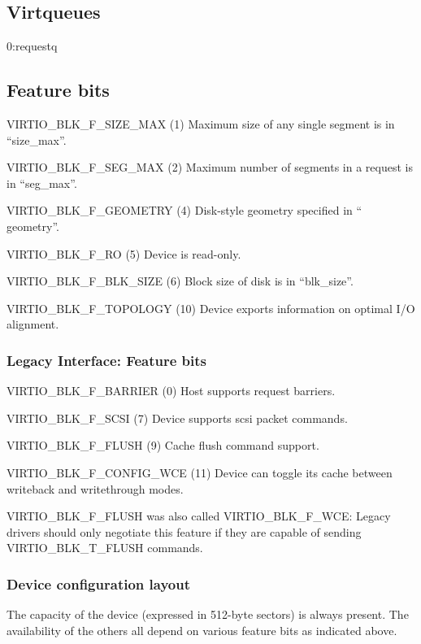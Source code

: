 \subsection{Virtqueues}\label{sec:Device Types / Block Device / Virtqueues}
  0:requestq

\subsection{Feature bits}\label{sec:Device Types / Block Device / Feature bits}

  VIRTIO_BLK_F_SIZE_MAX (1) Maximum size of any single segment is
    in “size_max”.

  VIRTIO_BLK_F_SEG_MAX (2) Maximum number of segments in a
    request is in “seg_max”.

  VIRTIO_BLK_F_GEOMETRY (4) Disk-style geometry specified in “
    geometry”.

  VIRTIO_BLK_F_RO (5) Device is read-only.

  VIRTIO_BLK_F_BLK_SIZE (6) Block size of disk is in “blk_size”.

  VIRTIO_BLK_F_TOPOLOGY (10) Device exports information on optimal I/O
    alignment.

\subsubsection{Legacy Interface: Feature bits}\label{sec:Device Types / Block Device / Feature bits / Legacy Interface: Feature bits}
  VIRTIO_BLK_F_BARRIER (0) Host supports request barriers.

  VIRTIO_BLK_F_SCSI (7) Device supports scsi packet commands.

  VIRTIO_BLK_F_FLUSH (9) Cache flush command support.

  VIRTIO_BLK_F_CONFIG_WCE (11) Device can toggle its cache between writeback
    and writethrough modes.

VIRTIO_BLK_F_FLUSH was also called VIRTIO_BLK_F_WCE: Legacy drivers
should only negotiate this feature if they are capable of sending
VIRTIO_BLK_T_FLUSH commands.

\subsubsection{Device configuration layout}\label{sec:Device Types / Block Device / Feature bits / Device configuration layout}

The capacity of the device (expressed in 512-byte sectors) is always
present. The availability of the others all depend on various feature
bits as indicated above.


